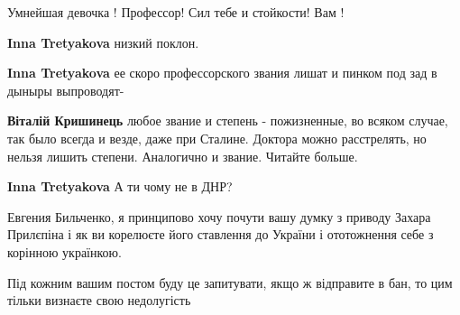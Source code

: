 \begin{itemize}
Умнейшая девочка ! Профессор! Сил тебе и стойкости! Вам ! 💙

\begin{itemize}
 
\textbf{Inna Tretyakova} низкий поклон.

 
\textbf{Inna Tretyakova} ее скоро профессорского звания лишат и пинком под зад в дыныры выпроводят-

 
\textbf{Віталій Кришинець} любое звание и степень - пожизненные, во всяком случае, так было всегда и везде, даже при Сталине. Доктора можно расстрелять, но нельзя лишить степени. Аналогично и звание. Читайте больше.

 
\textbf{Inna Tretyakova} А ти чому не в ДНР?
\end{itemize}

 

Евгения Бильченко, я принципово хочу почути вашу думку з приводу Захара
Прилєпіна і як ви корелюєте його ставлення до України і ототожнення себе з
корінною українкою.

Під кожним вашим постом буду це запитувати, якщо ж відправите в бан, то цим
тільки визнаєте свою недолугість


\end{itemize}
